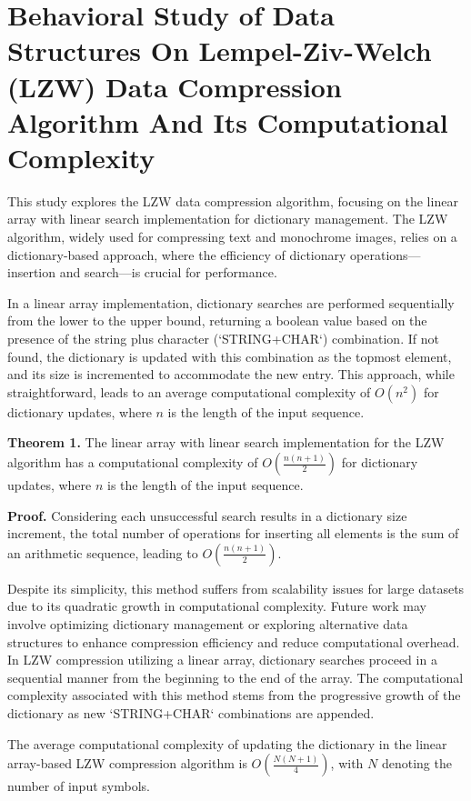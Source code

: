 \documentclass[12pt, a4paper]{article}
\begin{document}
\section{Behavioral Study of Data Structures On Lempel-Ziv-Welch (LZW) Data Compression Algorithm And Its Computational Complexity}

This study explores the LZW data compression algorithm, focusing on the linear array with linear search implementation for dictionary management. The LZW algorithm, widely used for compressing text and monochrome images, relies on a dictionary-based approach, where the efficiency of dictionary operations—insertion and search—is crucial for performance.

In a linear array implementation, dictionary searches are performed sequentially from the lower to the upper bound, returning a boolean value based on the presence of the string plus character (`STRING+CHAR`) combination. If not found, the dictionary is updated with this combination as the topmost element, and its size is incremented to accommodate the new entry. This approach, while straightforward, leads to an average computational complexity of $O(n^2)$ for dictionary updates, where $n$ is the length of the input sequence.

\textbf{Theorem 1.} The linear array with linear search implementation for the LZW algorithm has a computational complexity of $O\left(\frac{n(n+1)}{2}\right)$ for dictionary updates, where $n$ is the length of the input sequence.

\textbf{Proof.} Considering each unsuccessful search results in a dictionary size increment, the total number of operations for inserting all elements is the sum of an arithmetic sequence, leading to $O\left(\frac{n(n+1)}{2}\right)$.

Despite its simplicity, this method suffers from scalability issues for large datasets due to its quadratic growth in computational complexity. Future work may involve optimizing dictionary management or exploring alternative data structures to enhance compression efficiency and reduce computational overhead.
In LZW compression utilizing a linear array, dictionary searches proceed in a sequential manner from the beginning to the end of the array. The computational complexity associated with this method stems from the progressive growth of the dictionary as new `STRING+CHAR` combinations are appended.


The average computational complexity of updating the dictionary in the linear array-based LZW compression algorithm is \( O\left(\frac{N(N + 1)}{4}\right) \), with \( N \) denoting the number of input symbols.
\end{document}
